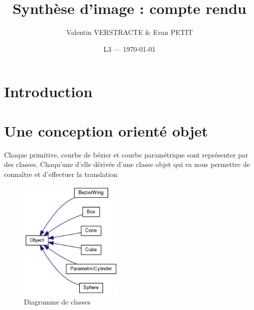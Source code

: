 \documentclass{article}
\title{Synthèse d'image : compte rendu} %
\author{Valentin VERSTRACTE \& Evan PETIT}
\date{L3 --- \today} %
\begin{document}
\maketitle %


\section*{Introduction} %



\section{Une conception orienté objet} %

Chaque primitive, courbe de bézier et courbe paramétrique sont représenter par des classes. Chaqu'une d'elle dérivée d'une classe objet qui va nous permettre de connaître et d'effectuer la translation

\begin{figure}[htp]
    \centering
    \includegraphics[width=5cm]{./assets/class_hierarchy.png}
    \caption{Diagramme de classes}
    \label{fig:classe}
\end{figure}


\end{document}
